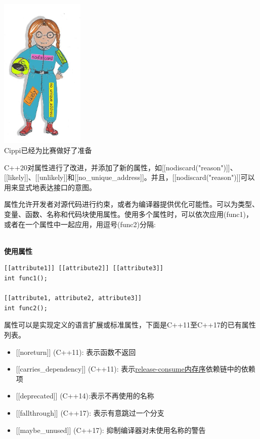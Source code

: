 \begin{center}
\includegraphics[width=0.3\textwidth]{content/3/chapter4/images/44.png}\\
Cippi已经为比赛做好了准备
\end{center}

C++20对属性进行了改进，并添加了新的属性，如[[nodiscard("reason")]]、[[likely]]、[[unlikely]]和[[no\_unique\_address]]。并且，[[nodiscard("reason")]]可以用来显式地表达接口的意图。


\begin{tcolorbox}[breakable,enhanced jigsaw,colback=blue!5!white,colframe=blue!75!black,title={属性}]

属性允许开发者对源代码进行约束，或者为编译器提供优化可能性。可以为类型、变量、函数、名称和代码块使用属性。使用多个属性时，可以依次应用(func1)，或者在一个属性中一起应用，用逗号(func2)分隔:

\hspace*{\fill} \\ %
\noindent
\textbf{使用属性}
\begin{lstlisting}[style=styleCXX]
[[attribute1]] [[attribute2]] [[attribute3]]
int func1();

[[attribute1, attribute2, attribute3]]
int func2();
\end{lstlisting}

属性可以是实现定义的语言扩展或标准属性，下面是C++11至C++17的已有属性列表。

\begin{itemize}
\item 
{}[[noreturn]] (C++11): 表示函数不返回

\item 
{}[[carries\_dependency]] (C++11): 表示\href{https://en.cppreference.com/w/cpp/atomic/memory_order#Release-Consume_ordering}{release-consume内存序}依赖链中的依赖项

\item 
{}[[deprecated]] (C++14):表示不再使用的名称

\item 
{}[[fallthrough]] (C++17): 表示有意跳过一个分支

\item 
{}[[maybe\_unused]] (C++17): 抑制编译器对未使用名称的警告
\end{itemize}
\end{tcolorbox}


